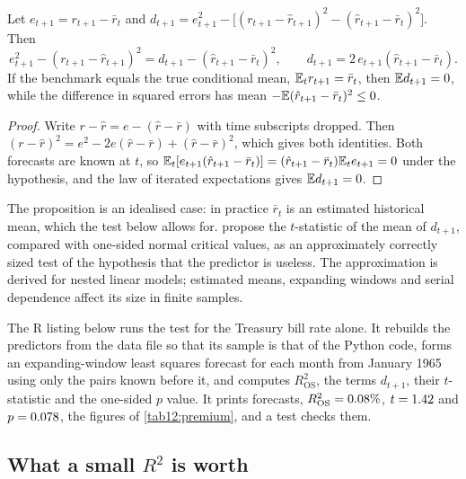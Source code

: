 \begin{chapterrefs}
\begin{proposition}\label{prop12:cw}
Let $e_{t+1}=r_{t+1}-\bar r_t$ and $d_{t+1}=e_{t+1}^2-\bigl[(r_{t+1}-\hat r_{t+1})^2-(\hat r_{t+1}-\bar r_t)^2\bigr]$. Then
\[
  e_{t+1}^2-(r_{t+1}-\hat r_{t+1})^2=d_{t+1}-(\hat r_{t+1}-\bar r_t)^2 ,\qquad d_{t+1}=2\,e_{t+1}(\hat r_{t+1}-\bar r_t).
\]
If the benchmark equals the true conditional mean, $\mathbb{E}_t r_{t+1}=\bar r_t$, then $\mathbb{E} d_{t+1}=0$, while the difference in squared errors has mean $-\mathbb{E}(\hat r_{t+1}-\bar r_t)^2\le0$.
\end{proposition}

\begin{proof}
Write $r-\hat r=e-(\hat r-\bar r)$ with time subscripts dropped. Then $(r-\hat r)^2=e^2-2e(\hat r-\bar r)+(\hat r-\bar r)^2$,
which gives both identities. Both forecasts are known at $t$, so $\mathbb{E}_t[e_{t+1}(\hat r_{t+1}-\bar r_t)]=
(\hat r_{t+1}-\bar r_t)\mathbb{E}_te_{t+1}=0$ under the hypothesis, and the law of iterated expectations gives $\mathbb{E} d_{t+1}=0$.
\end{proof}

The proposition is an idealised case: in practice $\bar r_t$ is an estimated historical mean, which the
test below allows for. \Textcite{clark2007} propose the $t$-statistic of the mean of $d_{t+1}$, compared with one-sided normal
critical values, as an approximately correctly sized test of the hypothesis that the predictor is useless. The
approximation is derived for nested linear models; estimated means, expanding windows and serial
dependence affect its size in finite samples.

The R listing below runs the test for the Treasury bill rate alone. It rebuilds the predictors from
the data file so that its sample is that of the Python code, forms an expanding-window least squares
forecast for each month from January 1965 using only the pairs known before it, and computes
$R^2_{\mathrm{OS}}$, the terms $d_{t+1}$, their $t$-statistic and the one-sided $p$ value. It prints
\eqOosN{} forecasts, $R^2_{\mathrm{OS}}=0.08\%$, $t=1.42$ and $p=0.078$, the figures of
\cref{tab12:premium}, and a test checks them.


\subsection{What a small $R^2$ is worth}


\end{chapterrefs}
